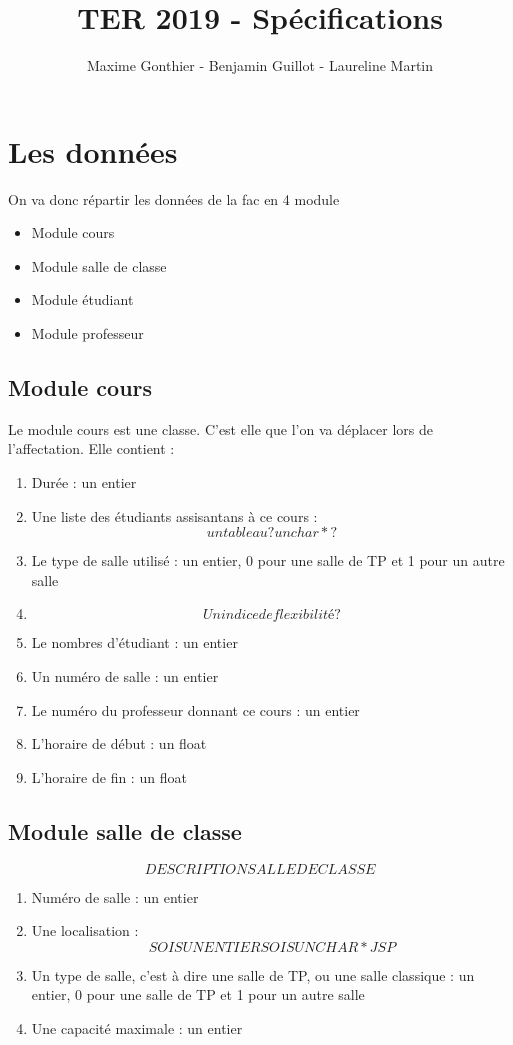 \documentclass[a4paper,11pt]{article}
\title{TER 2019 - Spécifications}
\author{Maxime Gonthier - Benjamin Guillot - Laureline Martin}
\begin{document}
	\clearpage
	\maketitle

\newpage
\section{Les données}
	On va donc répartir les données de la fac en 4 module\\
	\begin{itemize}
		\item Module cours
		\item Module salle de classe
		\item Module étudiant
		\item Module professeur
	\end{itemize}
	\subsection{Module cours}
		Le module cours est une classe. C'est elle que l'on va déplacer lors de l'affectation. Elle contient : 
		\begin{enumerate}
			\item Durée : un entier
			\item Une liste des étudiants assisantans à ce cours : $$un tableau ? un char* ?$$
			\item Le type de salle utilisé : un entier, 0 pour une salle de TP et 1 pour un autre salle
			\item $$Un indice de flexibilité ?$$
			\item Le nombres d'étudiant : un entier
			\item Un numéro de salle : un entier
			\item Le numéro du professeur donnant ce cours : un entier
			\item L'horaire de début : un float
			\item L'horaire de fin : un float
		\end{enumerate}
	\subsection{Module salle de classe}
		$$DESCRIPTION SALLE DE CLASSE$$
		\begin{enumerate}
			\item Numéro de salle : un entier
			\item Une localisation : $$SOIS UN ENTIER SOIS UN CHAR* JSP$$
			\item Un type de salle, c'est à dire une salle de TP, ou une salle classique : un entier, 0 pour une salle de TP et 1 pour un autre salle
			\item Une capacité maximale : un entier
		\end{enumerate}
\end{document}
